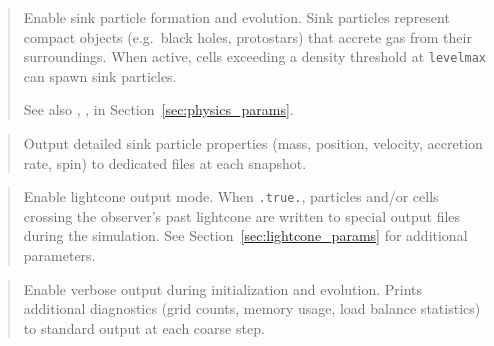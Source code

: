 \begin{quote}
Enable sink particle formation and evolution.  Sink particles represent
compact objects (e.g.\ black holes, protostars) that accrete gas from
their surroundings.  When active, cells exceeding a density threshold
at \texttt{levelmax} can spawn sink particles.

See also , ,  in
Section~\ref{sec:physics_params}.
\end{quote}

\label{param:sinkprops}

\begin{quote}
Output detailed sink particle properties (mass, position, velocity,
accretion rate, spin) to dedicated files at each snapshot.
\end{quote}

\label{param:lightcone}

\begin{quote}
Enable lightcone output mode.  When \texttt{.true.}, particles and/or
cells crossing the observer's past lightcone are written to special
output files during the simulation.  See
Section~\ref{sec:lightcone_params} for additional parameters.
\end{quote}

\label{param:verbose}

\begin{quote}
Enable verbose output during initialization and evolution.  Prints
additional diagnostics (grid counts, memory usage, load balance
statistics) to standard output at each coarse step.
\end{quote}

\label{param:jobcontrolfile}

